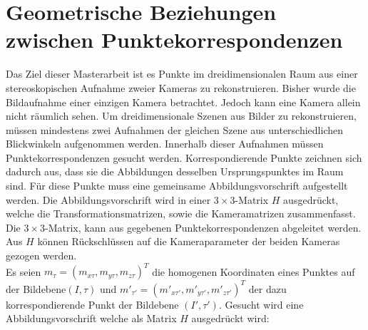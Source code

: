 \chapter{Geometrische Beziehungen zwischen Punktekorrespondenzen}
\label{sec:HFE}

Das Ziel dieser Masterarbeit ist es Punkte im dreidimensionalen Raum aus einer stereoskopischen Aufnahme zweier Kameras zu rekonstruieren. Bisher wurde die Bildaufnahme einer einzigen Kamera betrachtet. Jedoch kann eine Kamera allein nicht räumlich sehen. Um dreidimensionale Szenen aus Bilder zu rekonstruieren, müssen mindestens zwei Aufnahmen der gleichen Szene aus unterschiedlichen Blickwinkeln aufgenommen werden. Innerhalb dieser Aufnahmen müssen Punktekorrespondenzen gesucht werden. Korrespondierende Punkte zeichnen sich dadurch aus, dass sie die Abbildungen desselben Ursprungspunktes im Raum sind. Für diese Punkte muss eine gemeinsame Abbildungsvorschrift aufgestellt werden. Die Abbildungsvorschrift wird in einer $3 \times 3$-Matrix $H$ ausgedrückt, welche die Transformationsmatrizen, sowie die Kameramatrizen zusammenfasst. Die $3 \times 3$-Matrix, kann aus gegebenen Punktekorrespondenzen abgeleitet werden. Aus $H$ können Rückschlüssen auf die Kameraparameter der beiden Kameras gezogen werden.  \\


%

Es seien \ensuremath{m_{\tau} =(m_{x\tau},m_{y\tau},m_{z\tau})^T} die homogenen Koordinaten eines Punktes auf der Bildebene$(I,\tau)$ und \ensuremath{m'_{\tau'} = (m'_{x\tau'},m'_{y\tau'},m'_{z\tau'})^T} der dazu korrespondierende Punkt der Bildebene $(I',\tau')$. Gesucht wird eine Abbildungsvorschrift welche als Matrix $H$ ausgedrückt wird:

